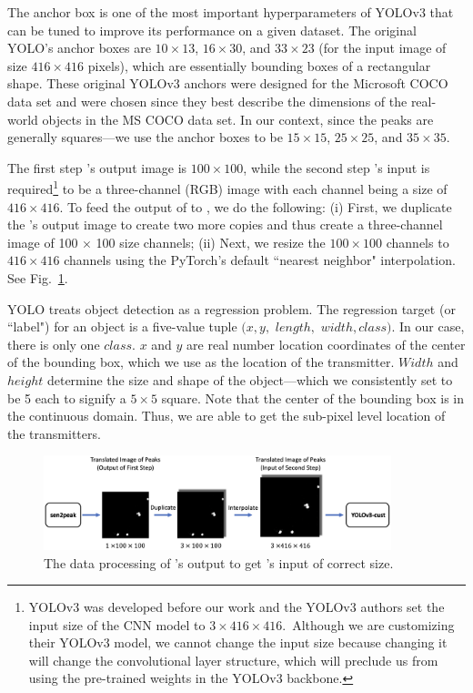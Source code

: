 The anchor box is one of the most important hyperparameters of YOLOv3 that can be tuned to improve
its performance on a given dataset.  The original YOLO's anchor boxes are $10\times13$,  $16\times30$, and $33\times23$ (for
the input image of size $416\times416$ pixels), which are essentially bounding boxes of a rectangular shape. 
These original YOLOv3 anchors were designed for the Microsoft COCO \cite{mscoco} data set and were chosen
since they best describe the dimensions of the real-world objects in the MS COCO data set. In our context,
since the peaks are generally squares---we use the anchor boxes to be $15\times15$, $25\times25$, and $35\times35$.


The first step \imgimg's output image is $100\times100$, while the second step \yolocust's input is required\footnote{YOLOv3 was developed before our work and the YOLOv3 authors set the input size of the CNN model to $3\times416\times416$.~Although we are customizing their YOLOv3 model, we cannot change the input size because changing it will change the convolutional layer structure, which will 
preclude us from using the pre-trained weights in the YOLOv3 backbone.} 
to be a three-channel (RGB) image with each channel being a size of $416\times 416$. 
To feed the output of \imgimg to \yolocust, we do the following: (i) First, we duplicate 
the \imgimg's output image to create two more copies and thus create a three-channel image
of 100 $\times$ 100 size channels; (ii) Next, we resize the $100\times100$ channels to $416\times416$ channels using the PyTorch's default ``nearest neighbor" interpolation. See Fig.~\ref{fig:yolo-preprocess}.

YOLO treats object detection as a regression problem. The regression target (or ``label") for an object is a five-value tuple $(x, y,$ $length,$ $width, class)$. 
In our case, there is only one $class$. 
$x$ and $y$ are real number location coordinates of the center of the bounding box, which we use as the location of the transmitter. 
$Width$ and $height$ determine the size and shape of the object---which we consistently set to be 5 each to signify a $5\times5$ square. 
Note that the center of the bounding box is in the continuous domain. 
Thus, we are able to get the sub-pixel level location of the transmitters.


\begin{figure}[t]
	\centering
	\includegraphics[width=0.9\textwidth]{chapters/wowmom-pmc/figures/yolo-preprocess.png}
	\caption{The data processing of \imgimg's output to get \yolocust's input of correct size.}
	\label{fig:yolo-preprocess}
\end{figure}


